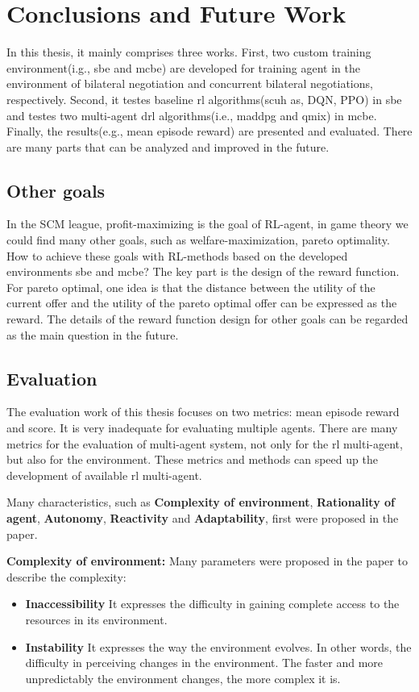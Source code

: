 \chapter{Conclusions and Future Work}
In this thesis, it mainly comprises three works. First, two custom training environment(i.g., \gls{sbe} and \gls{mcbe}) are developed for  training agent in the environment of bilateral negotiation and concurrent bilateral negotiations, respectively. Second, it testes baseline \gls{rl} algorithms(scuh as, DQN, PPO) in \gls{sbe} and testes two multi-agent drl algorithms(i.e., maddpg and qmix) in \gls{mcbe}. Finally, the results(e.g., mean episode reward) are presented and evaluated. There are many parts that can be analyzed and improved in the future.

\section{Other goals}
In the SCM league, profit-maximizing is the goal of RL-agent, in game theory we could find many other goals, such as welfare-maximization, pareto optimality. How to achieve these goals with RL-methods based on the developed environments \gls{sbe} and \gls{mcbe}? The key part is the design of the reward function. For pareto optimal, one idea is that the distance between the utility of the current offer and the utility of the pareto optimal offer can be expressed as the reward. The details of the reward function design for other goals can be regarded as the main question in the future.

\section{Evaluation}
The evaluation work of this thesis focuses on two metrics: mean episode reward and score. It is very inadequate for evaluating multiple agents. There are many metrics for the evaluation of multi-agent system, not only for the \gls{rl} multi-agent, but also for the environment. These metrics and methods can speed up the development of available \gls{rl} multi-agent. 

Many characteristics, such as \textbf{Complexity of environment}, \textbf{Rationality of agent}, \textbf{Autonomy}, \textbf{Reactivity} and \textbf{Adaptability}, first were proposed in the paper\parencite{Bitonto2010}.

\textbf{Complexity of environment:} Many parameters were proposed in the paper to describe the complexity:
\begin{itemize}
\item \textbf{Inaccessibility} It expresses the difficulty in gaining complete access to the resources in its environment.
\item \textbf{Instability} It expresses the way the environment evolves. In other words, the difficulty in perceiving changes in the environment. The faster and more unpredictably the environment changes, the more complex it is.
\end{itemize}

